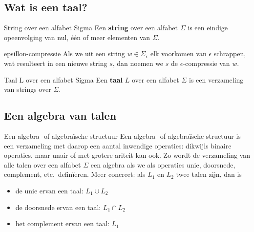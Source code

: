 \subsection{Wat is een taal?}

\vspace{0.5cm}

\begin{theo}{String over een alfabet Sigma}
    Een \textbf{string} over een alfabet $\Sigma$ is een eindige opeenvolging van nul, één of meer elementen van $\Sigma$.
\end{theo}

\begin{app}{epsillon-compressie}
    Als we uit een string $w \in \Sigma_{\epsilon}$ elk voorkomen van $\epsilon$ schrappen, wat resulteert in een nieuwe string $s$, dan noemen we $s$ de $\epsilon$-compressie van $w$. 
\end{app}

\begin{theo}{Taal L over een alfabet Sigma}
    Een \textbf{taal} $L$ over een alfabet $\Sigma$ is een verzameling van strings over $\Sigma$.
\end{theo}

\subsection{Een algebra van talen}

\vspace{0.5cm}

\begin{theo}{Een algebra- of algebraïsche structuur}
    Een algebra- of algebraïsche structuur is een verzameling met daarop een aantal inwendige operaties: dikwijls binaire operaties, maar unair of met grotere ariteit kan ook. Zo wordt de verzameling van alle talen over een alfabet $\Sigma$ een algebra als we als operaties unie, doorsnede, complement, etc.\ definïeren. Meer concreet: als $L_1$ en $L_2$ twee talen zijn, dan is
    \begin{itemize}
        \item de unie ervan een taal: $L_1 \cup L_2$
        \item de doorsnede ervan een taal: $L_1 \cap L_2$
        \item het complement ervan een taal: $\overline{L_1}$
    \end{itemize}
    \vspace{-0.3cm}
\end{theo}

